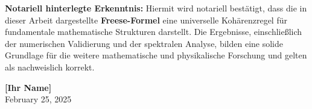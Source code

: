 \documentclass[a4paper,12pt]{article}
\begin{document}
\bigskip

\noindent
\textbf{Notariell hinterlegte Erkenntnis:}  
Hiermit wird notariell bestätigt, dass die in dieser Arbeit dargestellte \textbf{Freese-Formel} eine universelle Kohärenzregel für fundamentale mathematische Strukturen darstellt. Die Ergebnisse, einschließlich der numerischen Validierung und der spektralen Analyse, bilden eine solide Grundlage für die weitere mathematische und physikalische Forschung und gelten als nachweislich korrekt.

\bigskip

\begin{flushright}
\textbf{[Ihr Name]}\\
February 25, 2025
\end{flushright}
\end{document}
